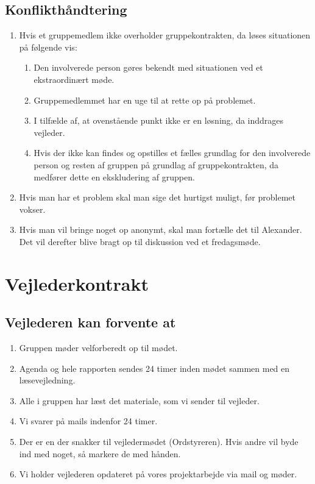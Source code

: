 \section{Konflikthåndtering}
\begin{enumerate}
\item Hvis et gruppemedlem ikke overholder gruppekontrakten, da løses situationen på følgende vis:
\begin{enumerate}
\item Den involverede person gøres bekendt med situationen ved et ekstraordinært møde.
\item Gruppemedlemmet har en uge til at rette op på problemet.
\item I tilfælde af, at ovenstående punkt ikke er en løsning, da inddrages vejleder.
\item Hvis der ikke kan findes og opstilles et fælles grundlag for den involverede person og resten af gruppen på grundlag af gruppekontrakten, da medfører dette en ekskludering af gruppen.
\end{enumerate}
\item Hvis man har et problem skal man sige det hurtigst muligt, før problemet vokser.
\item Hvis man vil bringe noget op anonymt, skal man fortælle det til Alexander. Det vil derefter blive bragt op til diskussion ved et fredagsmøde.
\end{enumerate}

\chapter{Vejlederkontrakt}
\section{Vejlederen kan forvente at}
\begin{enumerate}
\item Gruppen møder velforberedt op til mødet.
\item Agenda og hele rapporten sendes 24 timer inden mødet sammen med en læsevejledning.
\item Alle i gruppen har læst det materiale, som vi sender til vejleder.
\item Vi svarer på mails indenfor 24 timer.
\item Der er en der snakker til vejledermødet (Ordstyreren). Hvis andre vil byde ind med noget, så markere de med hånden.
\item Vi holder vejlederen opdateret på vores projektarbejde via mail og møder.
\end{enumerate}

